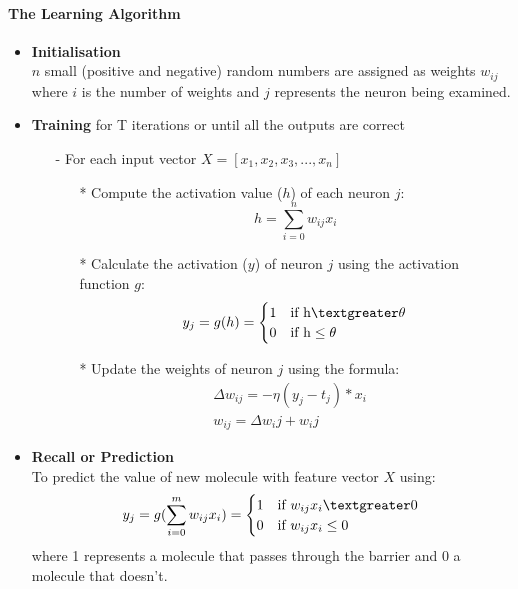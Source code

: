 \documentclass[a4paper,12pt]{report}
\begin{document}
			\paragraph{The Learning Algorithm \cite{StephenM2014}}
			\begin{itemize}
				\item \textbf{Initialisation}
					\\ $n$ small (positive and negative) random numbers are assigned as weights $w_{ij}$ where $i$ is the number of weights and $j$ represents the neuron being examined.
				\item \textbf{Training} for T iterations or until all the outputs are correct
					\begin{itemize}
						\item[-] For each input vector $X = [x_1,x_2,x_3,...,x_n]$
							\begin{itemize}
								\item[*] Compute the activation value ($h$) of each neuron $j$: \\
									\begin{equation}
										h = \sum_{i=0}^{n}w_{ij}x_i
									\end{equation}
								\item[*] Calculate the activation ($y$) of neuron $j$ using the activation function $g$: \\
									\begin{equation}
										y_j = g(h) = 
										\begin{cases}
											1 & \text{if h} \textgreater \theta \\
											0 & \text{if h} \le \theta
										\end{cases}
									\end{equation}
								\item[*] Update the weights of neuron $j$ using the formula: \\
									\begin{eqnarray}
										\Delta w_{ij} = - \eta(y_j - t_j) * x_i & \\
										w_{ij} = \Delta w_ij + w_ij
									\end{eqnarray}
								
							\end{itemize}
					\end{itemize}
				\item \textbf{Recall or Prediction}	
					\\To predict the value of new molecule with feature vector $X$ using:
					\begin{equation}
						y_j = g(\sum_{i=0}^{m}w_{ij}x_i) = 
						\begin{cases}
							1 & \text{if } w_{ij}x_i \textgreater 0 \\
							0 & \text{if } w_{ij}x_i \le 0
						\end{cases}
					\end{equation}
					where 1 represents a molecule that passes through the barrier and 0 a molecule that doesn't.
			\end{itemize}
\end{document}
